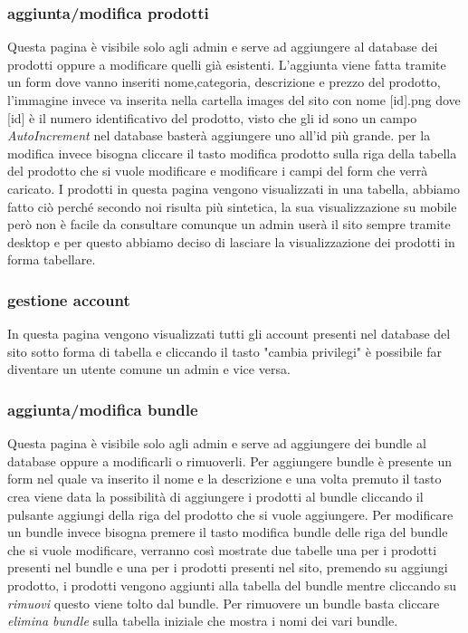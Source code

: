 \subsubsection{aggiunta/modifica prodotti}
Questa pagina è visibile solo agli admin e serve ad aggiungere al database dei prodotti oppure a modificare quelli già esistenti.\newline
L'aggiunta viene fatta tramite un form dove vanno inseriti nome,categoria, descrizione e prezzo del prodotto, l'immagine invece va inserita nella cartella images del sito con nome [id].png dove [id] è il numero identificativo del prodotto, visto che gli id sono un campo \emph{AutoIncrement} nel database basterà aggiungere uno all'id più grande.\newline
per la modifica invece bisogna cliccare il tasto modifica prodotto sulla riga della tabella del prodotto che si vuole modificare e modificare i campi del form che verrà caricato.\newline
I prodotti in questa pagina vengono visualizzati in una tabella, abbiamo fatto ciò perché secondo noi risulta più sintetica, la sua visualizzazione su mobile però non è facile da consultare comunque un admin userà il sito sempre tramite desktop e per questo abbiamo deciso di lasciare la visualizzazione dei prodotti in forma tabellare.

\subsubsection{gestione account}
In questa pagina vengono visualizzati tutti gli account presenti nel database del sito sotto forma di tabella e cliccando il tasto "cambia privilegi" è possibile far diventare un utente comune un admin e vice versa.

\subsubsection{aggiunta/modifica bundle}
Questa pagina è visibile solo agli admin e serve ad aggiungere dei bundle al database oppure a modificarli o rimuoverli.
Per aggiungere bundle è presente un form nel quale va inserito il nome e la descrizione e una volta premuto il tasto crea viene data la possibilità di aggiungere i prodotti al bundle cliccando il pulsante aggiungi della riga del prodotto che si vuole aggiungere.\newline
Per modificare un bundle invece bisogna premere il tasto modifica bundle delle riga del bundle che si vuole modificare, verranno così mostrate due tabelle una per i prodotti presenti nel bundle e una per i prodotti presenti nel sito, premendo su aggiungi prodotto, i prodotti vengono aggiunti alla tabella del bundle mentre cliccando su \emph{rimuovi} questo viene tolto dal bundle.\newline
Per rimuovere un bundle basta cliccare \emph{elimina bundle} sulla tabella iniziale che mostra i nomi dei vari bundle.

